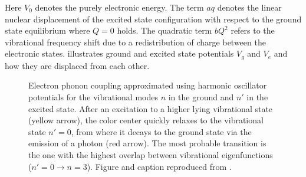     Here $V_0$ denotes the purely electronic energy. The term $aq$ denotes the linear nuclear displacement of the excited state configuration with respect to the ground state equilibrium where $Q = 0$ holds.
    The quadratic term $b Q^2$ refers to the vibrational frequency shift due to a redistribution of charge between the electronic states.  illustrates ground and excited state potentials $V_g$ and $V_e$ and how they are displaced from each other.

    \begin{figure}[!htb]
     \centering
     \caption[Electron-phonon coupling approximated]{Electron phonon coupling approximated using harmonic oscillator potentials for the vibrational modes $n$ in the ground and $n'$ in the excited state. After an excitation to a higher lying vibrational state (yellow arrow), the color center quickly relaxes to the vibrational state $n' = 0$, from where it decays to the ground state via the emission of a photon (red arrow). The most probable transition is the one with the highest overlap between vibrational eigenfunctions ($n' = 0 \to n = 3$). Figure and caption reproduced from \cite{Hepp2014dissertation}.}
     \label{fig::harmonic_model}
    \end{figure}

